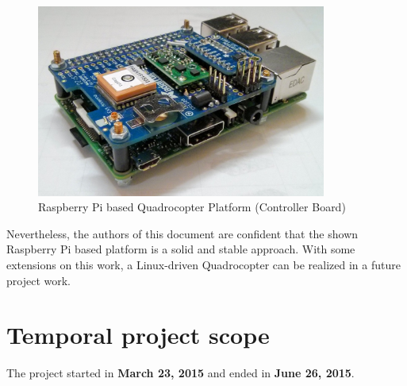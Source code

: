 \begin{figure}[h]
    \centering
    \includegraphics[width=0.85\textwidth]{fig/ch-project-goals/MainRaspberryPi}
    \caption{Raspberry Pi based Quadrocopter Platform (Controller Board)}
    \label{fig:projGoals:RpiPic}
\end{figure}

Nevertheless, the authors of this document are confident that the shown Raspberry Pi based platform is a solid and stable approach. With some extensions on this work, a Linux-driven Quadrocopter can be realized in a future project work.

\section{Temporal project scope}
\label{sec:projGoals:temporalProj}
The project started in \textbf{March 23, 2015} and ended in \textbf{June 26, 2015}.

